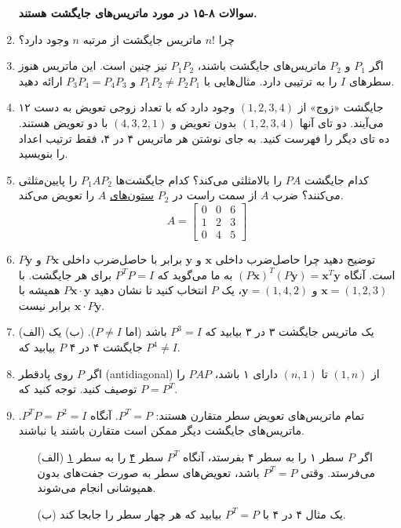 \documentclass[12pt, a4paper]{book}
\begin{document}
\begin{enumerate}
		\item[] \textbf{سوالات ۸-۱۵ در مورد ماتریس‌های جایگشت هستند.}
		\item چرا $n!$ ماتریس جایگشت از مرتبه $n$ وجود دارد؟
		
		\item اگر $P_1$ و $P_2$ ماتریس‌های جایگشت باشند، $P_1P_2$ نیز چنین است. این ماتریس هنوز سطرهای $I$ را به ترتیبی دارد. مثال‌هایی با $P_1P_2 \neq P_2P_1$ و $P_3P_4 = P_4P_3$ ارائه دهید.
		
		\item ۱۲ جایگشت «زوج» از $(1,2,3,4)$ وجود دارد که با تعداد زوجی تعویض به دست می‌آیند. دو تای آنها $(1,2,3,4)$ بدون تعویض و $(4,3,2,1)$ با دو تعویض هستند. ده تای دیگر را فهرست کنید. به جای نوشتن هر ماتریس ۴ در ۴، فقط ترتیب اعداد را بنویسید.
		
		\item کدام جایگشت $PA$ را بالامثلثی می‌کند؟ کدام جایگشت‌ها $P_1AP_2$ را پایین‌مثلثی می‌کنند؟ ضرب $A$ از سمت راست در $P_2$ \underline{ستون‌های} $A$ را تعویض می‌کند.
		\[ A = \begin{bmatrix} 0 & 0 & 6 \\ 1 & 2 & 3 \\ 0 & 4 & 5 \end{bmatrix} \]
		
		\item توضیح دهید چرا حاصل‌ضرب داخلی $\mathbf{x}$ و $\mathbf{y}$ برابر با حاصل‌ضرب داخلی $P\mathbf{x}$ و $P\mathbf{y}$ است. آنگاه $(P\mathbf{x})^T(P\mathbf{y})=\mathbf{x}^T\mathbf{y}$ به ما می‌گوید که $P^TP=I$ برای هر جایگشت. با $\mathbf{x}=(1,2,3)$ و $\mathbf{y}=(1,4,2)$، یک $P$ انتخاب کنید تا نشان دهید $P\mathbf{x} \cdot \mathbf{y}$ همیشه با $\mathbf{x} \cdot P\mathbf{y}$ برابر نیست.
		
		\item (الف) یک ماتریس جایگشت ۳ در ۳ بیابید که $P^3=I$ باشد (اما $P \neq I$).
		(ب) یک جایگشت ۴ در ۴ $P$ بیابید که $P^4 \neq I$.
		
		\item اگر $P$ روی پادقطر (antidiagonal) از $(1,n)$ تا $(n,1)$ دارای ۱ باشد، $PAP$ را توصیف کنید. توجه کنید که $P=P^T$.
		
		\item تمام ماتریس‌های تعویض سطر متقارن هستند: $P^T=P$. آنگاه $P^TP=P^2=I$. ماتریس‌های جایگشت دیگر ممکن است متقارن باشند یا نباشند.
		\begin{itemize}
			\item[(الف)] اگر $P$ سطر ۱ را به سطر ۴ بفرستد، آنگاه $P^T$ سطر \underline{۴} را به سطر \underline{۱} می‌فرستد. وقتی $P^T=P$ باشد، تعویض‌های سطر به صورت جفت‌های بدون همپوشانی انجام می‌شوند.
			\item[(ب)] یک مثال ۴ در ۴ با $P^T=P$ بیابید که هر چهار سطر را جابجا کند.
		\end{itemize}
		

\end{enumerate}
\end{document}
